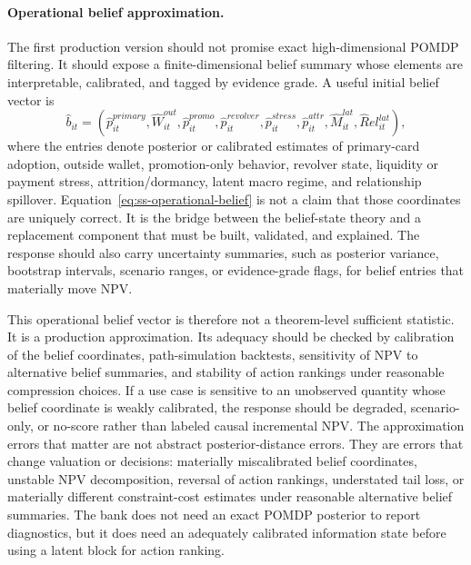\documentclass[11pt]{article}
\newcommand{\1}{\mathbf{1}}
\begin{document}
\paragraph{Operational belief approximation.}
The first production version should not promise exact high-dimensional POMDP
filtering. It should expose a finite-dimensional belief summary whose elements
are interpretable, calibrated, and tagged by evidence grade. A useful initial
belief vector is
\begin{equation}
  \widehat b_{it}
  =
  (\widehat p^{primary}_{it},\widehat W^{out}_{it},
   \widehat p^{promo}_{it},\widehat p^{revolver}_{it},
   \widehat p^{stress}_{it},\widehat p^{attr}_{it},
   \widehat M^{lat}_{it},\widehat Rel^{lat}_{it}),
  \label{eq:ss-operational-belief}
\end{equation}
where the entries denote posterior or calibrated estimates of primary-card
adoption, outside wallet, promotion-only behavior, revolver state, liquidity or
payment stress, attrition/dormancy, latent macro regime, and relationship
spillover. Equation~\eqref{eq:ss-operational-belief} is not a claim that those
coordinates are uniquely correct. It is the bridge between the belief-state
theory and a replacement component that must be built, validated, and explained.
The response should also carry uncertainty summaries, such as posterior
variance, bootstrap intervals, scenario ranges, or evidence-grade flags, for
belief entries that materially move NPV.

This operational belief vector is therefore not a theorem-level sufficient
statistic. It is a production approximation. Its adequacy should be checked by
calibration of the belief coordinates, path-simulation backtests, sensitivity of
NPV to alternative belief summaries, and stability of action rankings under
reasonable compression choices. If a use case is sensitive to an unobserved
quantity whose belief coordinate is weakly calibrated, the response should be
degraded, scenario-only, or no-score rather than labeled causal incremental NPV.
The approximation errors that matter are not abstract posterior-distance errors.
They are errors that change valuation or decisions: materially miscalibrated
belief coordinates, unstable NPV decomposition, reversal of action rankings,
understated tail loss, or materially different constraint-cost estimates under
reasonable alternative belief summaries. The bank does not need an exact POMDP
posterior to report diagnostics, but it does need an adequately calibrated
information state before using a latent block for action ranking.
\end{document}

